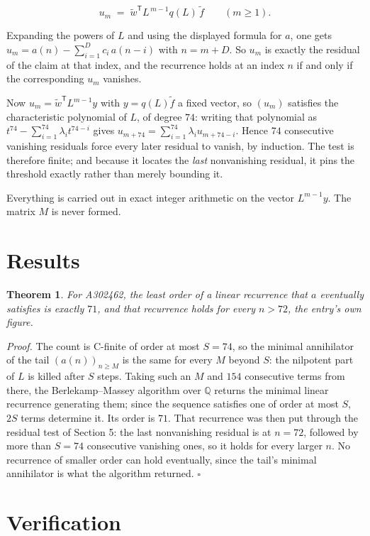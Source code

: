\documentclass[11pt]{article}
\newtheorem{theorem}{Theorem}
\theoremstyle{definition}
\begin{document}
\[u_m \;=\; \tilde w^{\mathsf T} L^{\,m-1} q(L)\,\tilde f \qquad (m \ge 1).\]

Expanding the powers of $L$ and using the displayed formula for $a$, one gets $u_m = a(n) - \sum_{i=1}^{D} c_i\,a(n-i)$ with $n = m + D$. So $u_m$ is exactly the residual of the claim at that index, and the recurrence holds at an index $n$ if and only if the corresponding $u_m$ vanishes.

Now $u_m = \tilde w^{\mathsf T} L^{m-1} y$ with $y = q(L)\tilde f$ a fixed vector, so $(u_m)$ satisfies the characteristic polynomial of $L$, of degree $74$: writing that polynomial as $t^{74} - \sum_{i=1}^{74} \lambda_i t^{74-i}$ gives $u_{m+74} = \sum_{i=1}^{74} \lambda_i u_{m+74-i}$. Hence $74$ consecutive vanishing residuals force every later residual to vanish, by induction. The test is therefore finite; and because it locates the {\itshape last} nonvanishing residual, it pins the threshold exactly rather than merely bounding it.

Everything is carried out in exact integer arithmetic on the vector $L^{m-1}y$. The matrix $M$ is never formed.

\section{Results}

\begin{theorem} For A302462, the least order of a linear recurrence that $a$ eventually satisfies is exactly $71$, and that recurrence holds for every $n > 72$, the entry's own figure.\end{theorem}

{\itshape Proof.} The count is C-finite of order at most $S = 74$, so the minimal annihilator of the tail $(a(n))_{n \ge M}$ is the same for every $M$ beyond $S$: the nilpotent part of $L$ is killed after $S$ steps. Taking such an $M$ and $154$ consecutive terms from there, the Berlekamp--Massey algorithm over $\mathbb{Q}$ returns the minimal linear recurrence generating them; since the sequence satisfies one of order at most $S$, $2S$ terms determine it. Its order is $71$. That recurrence was then put through the residual test of Section 5: the last nonvanishing residual is at $n = 72$, followed by more than $S = 74$ consecutive vanishing ones, so it holds for every larger $n$. No recurrence of smaller order can hold eventually, since the tail's minimal annihilator is what the algorithm returned. $\square$

\section{Verification}
\end{document}
